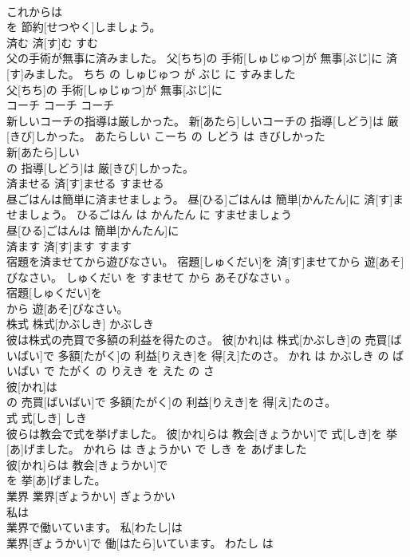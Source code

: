 \documentclass[8pt]{extreport}
\begin{document}
\begin{CJK}{UTF8}{min}
\\	これからは
\\	を 節約[せつやく]しましょう。			
\\	済む	済[す]む	すむ	
\\	父の手術が無事に済みました。	父[ちち]の 手術[しゅじゅつ]が 無事[ぶじ]に 済[す]みました。	ちち の しゅじゅつ が ぶじ に すみました	
\\	父[ちち]の 手術[しゅじゅつ]が 無事[ぶじ]に
\\	コーチ	コーチ	コーチ	
\\	新しいコーチの指導は厳しかった。	新[あたら]しいコーチの 指導[しどう]は 厳[きび]しかった。	あたらしい こーち の しどう は きびしかった	
\\	新[あたら]しい
\\	の 指導[しどう]は 厳[きび]しかった。			
\\	済ませる	済[す]ませる	すませる	
\\	昼ごはんは簡単に済ませましょう。	昼[ひる]ごはんは 簡単[かんたん]に 済[す]ませましょう。	ひるごはん は かんたん に すませましょう	
\\	昼[ひる]ごはんは 簡単[かんたん]に
\\	済ます	済[す]ます	すます	
\\	宿題を済ませてから遊びなさい。	宿題[しゅくだい]を 済[す]ませてから 遊[あそ]びなさい。	しゅくだい を すませて から あそびなさい 。	
\\	宿題[しゅくだい]を
\\	から 遊[あそ]びなさい。			
\\	株式	株式[かぶしき]	かぶしき	
\\	彼は株式の売買で多額の利益を得たのさ。	彼[かれ]は 株式[かぶしき]の 売買[ばいばい]で 多額[たがく]の 利益[りえき]を 得[え]たのさ。	かれ は かぶしき の ばいばい で たがく の りえき を えた の さ	
\\	彼[かれ]は
\\	の 売買[ばいばい]で 多額[たがく]の 利益[りえき]を 得[え]たのさ。			
\\	式	式[しき]	しき	
\\	彼らは教会で式を挙げました。	彼[かれ]らは 教会[きょうかい]で 式[しき]を 挙[あ]げました。	かれら は きょうかい で しき を あげました	
\\	彼[かれ]らは 教会[きょうかい]で
\\	を 挙[あ]げました。			
\\	業界	業界[ぎょうかい]	ぎょうかい	
\\	私は
\\	業界で働いています。	私[わたし]は
\\	業界[ぎょうかい]で 働[はたら]いています。	わたし は 

\end{CJK}
\end{document}
